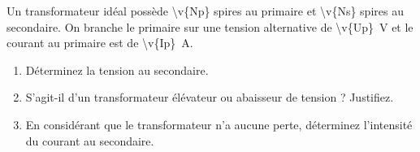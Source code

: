 Un transformateur idéal possède \num{\v{Np}} spires au primaire et \num{\v{Ns}} spires au secondaire. On branche le primaire sur une tension alternative de \qty{\v{Up}}{V} et le courant au primaire est de \qty{\v{Ip}}{A}.

\begin{enumerate}[label=\alph*)]
    \item Déterminez la tension au secondaire.
    \item S'agit-il d'un transformateur élévateur ou abaisseur de tension ? Justifiez.
    \item En considérant que le transformateur n'a aucune perte, déterminez l'intensité du courant au secondaire.
\end{enumerate}
